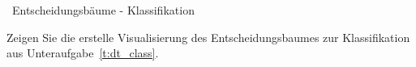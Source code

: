 \begin{task}[credit=4]{\codesym~Entscheidungsbäume - Klassifikation}
 \begin{subtask}[points=1,title=Visualisierung]
Zeigen Sie die erstelle Visualisierung des Entscheidungsbaumes zur Klassifikation aus Unteraufgabe~\ref{t:dt_class}.

\begin{solution}
\end{solution}

\end{subtask}
\end{task}

